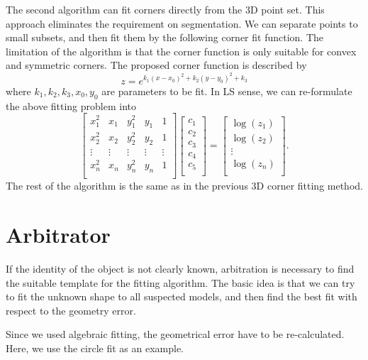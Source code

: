 \documentclass[twocolumn]{IEEEtran}
\begin{document}
The second algorithm can fit corners directly from the 3D point set. This approach eliminates the requirement on segmentation. We can separate points to small subsets, and then fit them by the following corner fit function. The limitation of the algorithm is that the corner function is only suitable for convex and symmetric corners. The proposed corner function is
described by
\[
z=e^{k_1(x-x_0)^2+k_2(y-y_0)^2+k_3}
\]
where $k_1, k_2, k_3, x_0, y_0$ are parameters to be fit. In LS sense, we can re-formulate the above fitting problem into 
    $$\begin{bmatrix}
    x_1^2 & x_1 & y_1^2 & y_1 & 1 \\
    x_2^2 & x_2 & y_2^2 & y_2 & 1 \\
    \vdots& \vdots&\vdots&\vdots&\vdots \\
    x_n^2 & x_n & y_n^2 & y_n & 1 \\
    \end{bmatrix}
    \begin{bmatrix}
    c_1 \\ c_2 \\ c_3 \\ c_4 \\ c_5 \\ 
    \end{bmatrix}
    =
    \begin{bmatrix}
    \log(z_1) \\ \log(z_2) \\ \vdots \\ \log(z_n) \\
    \end{bmatrix}.     $$
The rest of the algorithm is the same as in the previous 3D corner fitting method.



\section{Arbitrator}
If the identity of the object is not clearly known, arbitration is necessary to find the suitable template for the fitting algorithm. The basic idea is that we can try to fit the unknown shape to all suspected models, and then find the best fit with respect to the geometry error. 

Since we used algebraic fitting, the geometrical error have to be re-calculated. Here, we use the circle fit as an example.
\end{document}
